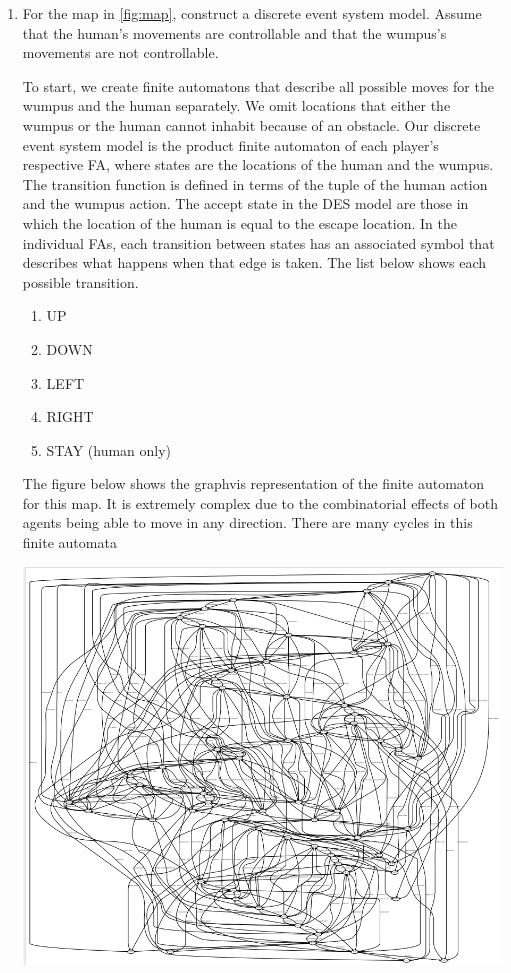 \documentclass[12pt,letterpaper]{ntdhw}
\begin{document}
\begin{enumerate}

  \item For the map in \autoref{fig:map}, construct a discrete event
  system model.  Assume that the human's movements are controllable
  and that the wumpus's movements are not controllable.
  
To start, we create finite automatons that describe all possible moves for the wumpus and the human separately. We omit locations that either the wumpus or the human cannot inhabit because of an obstacle. Our discrete event system model is the product finite automaton of each player's respective FA, where states are the locations of the human and the wumpus. The transition function is defined in terms of the tuple of the human action and the wumpus action. The accept state in the DES model are those in which the location of the human is equal to the escape location. In the individual FAs, each transition between states has an associated symbol that describes what happens when that edge is taken. The list below shows each possible transition.
\begin{enumerate}
    \item UP
    \item DOWN
    \item LEFT
    \item RIGHT
    \item STAY (human only)
    
\end{enumerate}The figure below shows the graphvis representation of the finite automaton for this map. It is extremely complex due to the combinatorial effects of both agents being able to move in any direction. There are many cycles in this finite automata

\begin{center}
\includegraphics[scale=0.5]{Q2_graphviz.png}
\end{center}


\end{enumerate}
\end{document}
